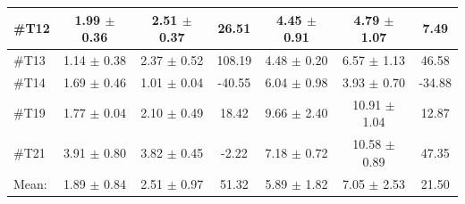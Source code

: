 \begin{longtable} {l|c|c|c|c|c|c}
\#T12 & 1.99 $\pm$ 0.36 & 2.51 $\pm$ 0.37 & 26.51 & 4.45 $\pm$ 0.91  & 4.79 $\pm$ 1.07 & 7.49 \\ \hline
\#T13 & 1.14 $\pm$ 0.38 & 2.37 $\pm$ 0.52 & 108.19 & 4.48 $\pm$ 0.20 & 6.57 $\pm$ 1.13 & 46.58\\ \hline
\#T14 & 1.69 $\pm$ 0.46 & 1.01 $\pm$ 0.04 & -40.55 & 6.04 $\pm$ 0.98 & 3.93 $\pm$ 0.70 & -34.88 \\ \hline
\#T19 & 1.77 $\pm$ 0.04 & 2.10 $\pm$ 0.49 & 18.42 & 9.66 $\pm$ 2.40 & 10.91  $\pm$ 1.04 & 12.87 \\ \hline
\#T21 & 3.91 $\pm$ 0.80 & 3.82 $\pm$ 0.45 & -2.22 &7.18 $\pm$ 0.72 & 10.58 $\pm$ 0.89 & 47.35 \\ \hline
Mean:  & 1.89 $\pm$ 0.84 & 2.51 $\pm$ 0.97 & 51.32 & 5.89 $\pm$ 1.82 & 7.05 $\pm$ 2.53 & 21.50 \\ \hline 
\end{longtable}


